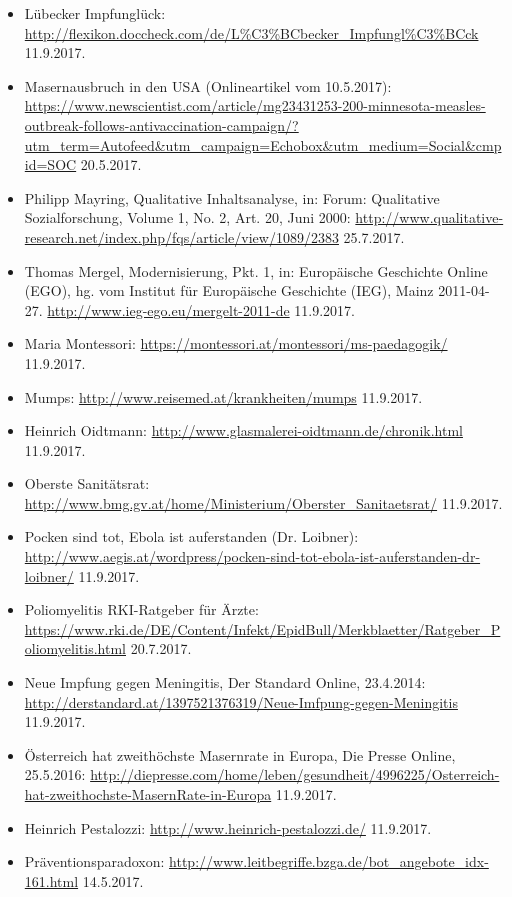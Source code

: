 \documentclass[
    a4paper,
    12pt,
    hyphens,
    chapterprefix=true,
    headheight=33pt,
    footheight=29pt,
    headings=optiontohead,
]{scrartcl}
\begin{document}
{\begin{itemize}
\item{Lübecker Impfunglück: \url{http://flexikon.doccheck.com/de/L\%C3\%BCbecker_Impfungl\%C3\%BCck} 11.9.2017.}
\item{Masernausbruch in den USA (Onlineartikel vom 10.5.2017): \url{https://www.newscientist.com/article/mg23431253-200-minnesota-measles-outbreak-follows-antivaccination-campaign/?utm_term=Autofeed&utm_campaign=Echobox&utm_medium=Social&cmpid=SOC} 20.5.2017.}
\item{Philipp Mayring, Qualitative Inhaltsanalyse, in: Forum: Qualitative Sozialforschung, Volume 1, No. 2, Art. 20, Juni 2000: \url{http://www.qualitative-research.net/index.php/fqs/article/view/1089/2383} 25.7.2017.}
\item{Thomas Mergel, Modernisierung, Pkt. 1, in: Europäische Geschichte Online (EGO), hg. vom Institut für Europäische Geschichte (IEG), Mainz 2011-04-27. \url{http://www.ieg-ego.eu/mergelt-2011-de} 11.9.2017.}
\item{Maria Montessori: \url{https://montessori.at/montessori/ms-paedagogik/} \\11.9.2017.}
\item{Mumps: \url{http://www.reisemed.at/krankheiten/mumps} 11.9.2017.}
\item{Heinrich Oidtmann: \url{http://www.glasmalerei-oidtmann.de/chronik.html} \\11.9.2017.}
\item{Oberste Sanitätsrat: \url{http://www.bmg.gv.at/home/Ministerium/Oberster_Sanitaetsrat/} 11.9.2017.}
\item{Pocken sind tot, Ebola ist auferstanden (Dr. Loibner): \url{http://www.aegis.at/wordpress/pocken-sind-tot-ebola-ist-auferstanden-dr-loibner/} 11.9.2017.}
\item{Poliomyelitis RKI-Ratgeber für Ärzte: \url{https://www.rki.de/DE/Content/Infekt/EpidBull/Merkblaetter/Ratgeber_Poliomyelitis.html} 20.7.2017.}
\item{Neue Impfung gegen Meningitis, Der Standard Online, 23.4.2014: \url{http://derstandard.at/1397521376319/Neue-Imfpung-gegen-Meningitis} 11.9.2017.}
\item{Österreich hat zweithöchste Masernrate in Europa, Die Presse Online, 25.5.2016: \url{http://diepresse.com/home/leben/gesundheit/4996225/Osterreich-hat-zweithochste-MasernRate-in-Europa} 11.9.2017.}
\item{Heinrich Pestalozzi: \url{http://www.heinrich-pestalozzi.de/} 11.9.2017.}
\item{Präventionsparadoxon: \url{http://www.leitbegriffe.bzga.de/bot_angebote_idx-161.html} 14.5.2017.}

\end{itemize}}
\end{document}
